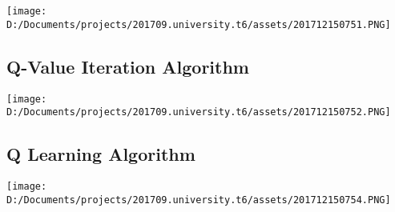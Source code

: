 \documentclass[11pt]{article}
\makeatletter
\def\maxwidth{\ifdim\Gin@nat@width>\linewidth\linewidth
    \else\Gin@nat@width\fi}
\let\Oldincludegraphics\includegraphics
\renewcommand{\includegraphics}[1]{\Oldincludegraphics[width=.8\maxwidth]{#1}}
\makeatother
\begin{document}
\texttt{[image: D:/Documents/projects/201709.university.t6/assets/201712150751.PNG]}

\hypertarget{q-value-iteration-algorithm}{%
\subsection{Q-Value Iteration
Algorithm}\label{q-value-iteration-algorithm}}

\texttt{[image: D:/Documents/projects/201709.university.t6/assets/201712150752.PNG]}

\hypertarget{q-learning-algorithm}{%
\subsection{Q Learning Algorithm}\label{q-learning-algorithm}}

\texttt{[image: D:/Documents/projects/201709.university.t6/assets/201712150754.PNG]}


    
    
    
    
\end{document}
